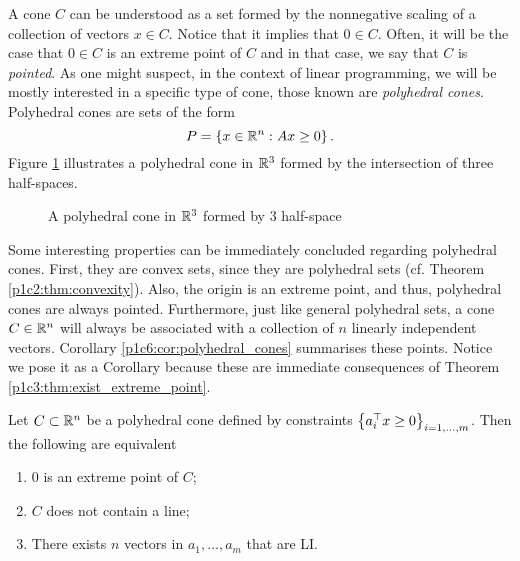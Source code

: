 A cone $C$ can be understood as a set formed by the nonnegative scaling  of a collection of vectors $x \in C$. Notice that it implies that $ 0 \in C$. Often, it will be the case that $ 0 \in C$ is an extreme point of $C$ and in that case, we say that $C$ is \emph{pointed}. As one might suspect, in the context of linear programming, we will be mostly interested in a specific type of cone, those known are \emph{polyhedral cones}. Polyhedral cones are sets of the form 
%
\begin{equation*}
	P = \left\{ x \in \mathbb{R}^n : Ax \geq 0 \right \}.
\end{equation*}
%
Figure \ref{p1c6:fig:poly_cone} illustrates a polyhedral cone in $\mathbb{R}^3$ formed by the intersection of three half-spaces. 
%
\begin{figure}[h]
	\caption{A polyhedral cone in $\mathbb{R}^3$ formed by 3 half-space} \label{p1c6:fig:poly_cone}
\end{figure}
%

Some interesting properties can be immediately concluded regarding polyhedral cones. First, they are convex sets, since they are polyhedral sets (cf. Theorem \ref{p1c2:thm:convexity}). Also, the origin is an extreme point, and thus, polyhedral cones are always pointed. Furthermore, just like general polyhedral sets, a cone $C \in \mathbb{R}^n$ will always be associated with a collection of $n$ linearly independent vectors. Corollary \ref{p1c6:cor:polyhedral_cones} summarises these points. Notice we pose it as a Corollary because these are immediate consequences of Theorem \ref{p1c3:thm:exist_extreme_point}. 

\begin{corollary}\label{p1c6:cor:polyhedral_cones} 
	Let $C \subset \mathbb{R}^n$ be a polyhedral cone defined by constraints $\left\{ a_i^\top x \geq 0 \right \}_{i =1,\dots,m}$. Then the following are equivalent
	\begin{enumerate}
		\item $0$ is an extreme point of $C$;
		\item $C$ does not contain a line;
		\item There exists $n$ vectors in $a_1, \dots, a_m$ that are LI.	
	\end{enumerate}
\end{corollary}

